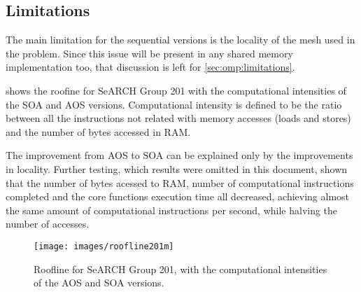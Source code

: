 \subsection{Limitations}
\label{sec:seq:limitations}

The main limitation for the sequential versions is the locality of the mesh used in the problem. Since this issue will be present in any shared memory implementation too, that discussion is left for \cref{sec:omp:limitations}.

 shows the roofine for SeARCH Group 201 with the computational intensities of the SOA and AOS versions. Computational intensity is defined to be the ratio between all the instructions not related with memory accesses (loads and stores) and the number of bytes accessed in RAM.

The improvement from AOS to SOA can be explained only by the improvements in locality. Further testing, which results were omitted in this document, shown that the number of bytes acessed to RAM, number of computational instructions completed and the core functions execution time all decreased, achieving almost the same amount of computational instructions per second, while halving the number of accesses.

\begin{figure}
	\centering
	\texttt{[image: images/roofline201m]}
	\caption{Roofline for SeARCH Group 201, with the computational intensities of the AOS and SOA versions.}
	\label{fig:roofline201}
\end{figure}
